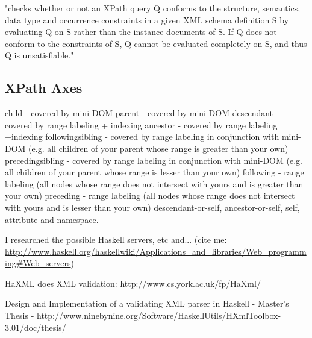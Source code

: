 
"checks whether or not an XPath query Q conforms to the structure, semantics, data type and occurrence constraints in a given XML schema definition S by evaluating Q on S rather than the instance documents of S. If Q does not conform to the constraints of S, Q cannot be evaluated completely on S, and thus Q is unsatisfiable."\cite{groppe:filtering}


\subsection{XPath Axes}
child - covered by mini-DOM
parent - covered by mini-DOM
descendant - covered by range labeling + indexing
ancestor - covered by range labeling +indexing
followingsibling  - covered by range labeling in conjunction with mini-DOM (e.g. all children of your parent whose range is greater than your own)
precedingsibling - covered by range labeling in conjunction with mini-DOM (e.g. all children of your parent whose range is lesser than your own)
following - range labeling (all nodes whose range does not intersect with yours and is greater than your own)
preceding - range labeling (all nodes whose range does not intersect with yours and is lesser than your own)
descendant-or-self, 
ancestor-or-self, 
self, 
attribute and 
namespace.


	I researched the possible Haskell servers, etc and...  (cite me: \url{http://www.haskell.org/haskellwiki/Applications_and_libraries/Web_programming#Web_servers})



HaXML does XML validation: http://www.cs.york.ac.uk/fp/HaXml/




Design and Implementation of a validating XML parser in Haskell - Master's Thesis - http://www.ninebynine.org/Software/HaskellUtils/HXmlToolbox-3.01/doc/thesis/